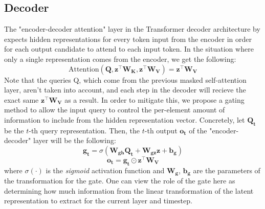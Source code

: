 \subsection{Decoder}
The "encoder-decoder attention" layer in the Transformer decoder architecture by \citet{vaswani17}  expects hidden representations for every token input from the encoder in order for each output candidate to attend to each input token. In the situation where only a single representation comes from the encoder, we get the following:
$$\text{Attention}(\mathbf{Q}, \mathbf{z}^\top \mathbf{W_K}, \mathbf{z}^\top \mathbf{W_V}) = \mathbf{z}^\top \mathbf{W_V}$$
Note that the queries Q, which come from the previous masked self-attention layer, aren't taken into account, and each step in the decoder will recieve the exact same $\mathbf{z}^\top \mathbf{W_V}$ as a result.  In order to mitigate this, we propose a gating method to allow the input query to control the per-element amount of information to include from the hidden representation vector. %
Concretely, let $\mathbf{Q_t}$ be the $t$-th query representation. Then, the $t$-th output $\mathbf{o_t}$ of the "encoder-decoder" layer will be the following:
$$\mathbf{g_t} = \sigma(\mathbf{W_{gh}}  \mathbf{Q_t} + \mathbf{W_{gz}}  \mathbf{z} +  \mathbf{b_g})$$
$$\mathbf{o_t} = \mathbf{g_t} \odot \mathbf{z}^\top\mathbf{W_V}$$
\noindent where $\sigma(\cdot)$ is the \textit{sigmoid} activation function and $\mathbf{W_g}$, $\mathbf{b_g}$ are the parameters of the transformation for the gate.
One can view the role of the gate here as determining how much information from the linear transformation of the latent representation to extract for the current layer and timestep.
